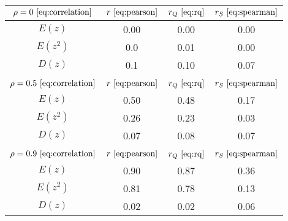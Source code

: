 \begin{tabular}{|c|c|c|c|}
\hline
$\rho = 0~\eqref{eq:correlation}$ & $r ~\eqref{eq:pearson}$ & $r_Q ~\eqref{eq:rq}$ & $r_S ~\eqref{eq:spearman}$\\
\hline
$E(z)$ & 0.00 & 0.00 & 0.00\\
\hline
$E(z^2)$ & 0.0 & 0.01 & 0.00\\
\hline
$D(z)$ & 0.1 & 0.10 & 0.07\\
\hline
& & & \\
\hline
$\rho = 0.5~\eqref{eq:correlation}$ & $r ~\eqref{eq:pearson}$ & $r_Q ~\eqref{eq:rq}$ & $r_S ~\eqref{eq:spearman}$\\
\hline
$E(z)$ & 0.50 & 0.48 & 0.17\\
\hline
$E(z^2)$ & 0.26 & 0.23 & 0.03\\
\hline
$D(z)$ & 0.07 & 0.08 & 0.07\\
\hline
& & & \\
\hline
$\rho = 0.9~\eqref{eq:correlation}$ & $r ~\eqref{eq:pearson}$ & $r_Q ~\eqref{eq:rq}$ & $r_S ~\eqref{eq:spearman}$\\
\hline
$E(z)$ & 0.90 & 0.87 & 0.36\\
\hline
$E(z^2)$ & 0.81 & 0.78 & 0.13\\
\hline
$D(z)$ & 0.02 & 0.02 & 0.06\\
\hline
\end{tabular}

